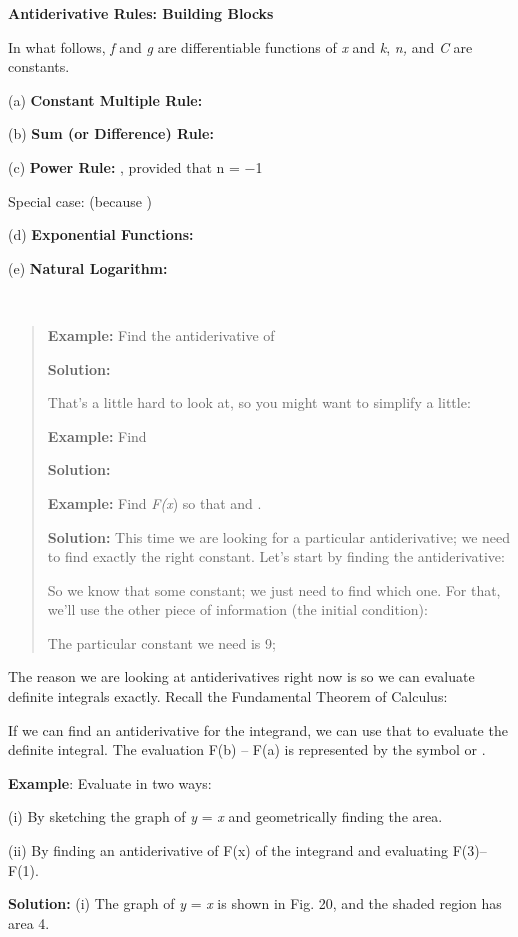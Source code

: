 \textbf{Antiderivative Rules: Building Blocks}

In what follows, \emph{f} and \emph{g} are differentiable functions of
\emph{x} and \emph{k}, \emph{n,} and \emph{C} are constants.

(a) \textbf{Constant Multiple Rule:}

(b) \textbf{Sum (or Difference) Rule:}

(c) \textbf{Power Rule:} , provided that n = −1

Special case: (because )

(d) \textbf{Exponential Functions: }

(e) \textbf{Natural Logarithm:}

\textbf{\\
}

\begin{quote}
\textbf{Example:} Find the antiderivative of

\textbf{Solution:}

That's a little hard to look at, so you might want to simplify a little:

\textbf{Example:} Find

\textbf{Solution:}

\textbf{Example:} Find \emph{F(x}) so that and .

\textbf{Solution:} This time we are looking for a particular
antiderivative; we need to find exactly the right constant. Let's start
by finding the antiderivative:

So we know that some constant; we just need to find which one. For that,
we'll use the other piece of information (the initial condition):

The particular constant we need is 9;
\end{quote}

The reason we are looking at antiderivatives right now is so we can
evaluate definite integrals exactly. Recall the Fundamental Theorem of
Calculus:

If we can find an antiderivative for the integrand, we can use that to
evaluate the definite integral. The evaluation F(b) -- F(a) is
represented by the symbol or .

\textbf{Example}: Evaluate in two ways:

(i) By sketching the graph of \emph{y} = \emph{x} and geometrically
finding the area.

(ii) By finding an antiderivative of F(x) of the integrand and
evaluating F(3)--F(1).

\textbf{Solution:} (i) The graph of \emph{y} = \emph{x} is shown in Fig.
20, and the shaded region has area 4.

